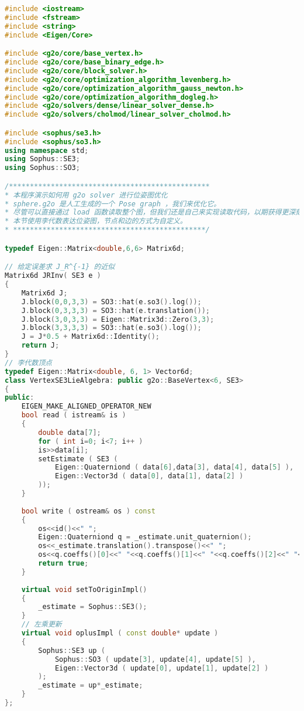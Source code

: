 \clearpage
\begin{lstlisting}[language=c++,caption=slambook/ch11/pose\_graph\_g2o\_lie\_algebra.cpp（片段）]
#include <iostream>
#include <fstream>
#include <string>
#include <Eigen/Core>

#include <g2o/core/base_vertex.h>
#include <g2o/core/base_binary_edge.h>
#include <g2o/core/block_solver.h>
#include <g2o/core/optimization_algorithm_levenberg.h>
#include <g2o/core/optimization_algorithm_gauss_newton.h>
#include <g2o/core/optimization_algorithm_dogleg.h>
#include <g2o/solvers/dense/linear_solver_dense.h>
#include <g2o/solvers/cholmod/linear_solver_cholmod.h>

#include <sophus/se3.h>
#include <sophus/so3.h>
using namespace std;
using Sophus::SE3;
using Sophus::SO3;

/************************************************
* 本程序演示如何用 g2o solver 进行位姿图优化
* sphere.g2o 是人工生成的一个 Pose graph ，我们来优化它。
* 尽管可以直接通过 load 函数读取整个图，但我们还是自己来实现读取代码，以期获得更深刻的理解。
* 本节使用李代数表达位姿图，节点和边的方式为自定义。
* **********************************************/

typedef Eigen::Matrix<double,6,6> Matrix6d;

// 给定误差求 J_R^{-1} 的近似
Matrix6d JRInv( SE3 e )
{
	Matrix6d J;
	J.block(0,0,3,3) = SO3::hat(e.so3().log());
	J.block(0,3,3,3) = SO3::hat(e.translation());
	J.block(3,0,3,3) = Eigen::Matrix3d::Zero(3,3);
	J.block(3,3,3,3) = SO3::hat(e.so3().log());
	J = J*0.5 + Matrix6d::Identity();
	return J;
}
// 李代数顶点
typedef Eigen::Matrix<double, 6, 1> Vector6d;
class VertexSE3LieAlgebra: public g2o::BaseVertex<6, SE3>
{
public:
	EIGEN_MAKE_ALIGNED_OPERATOR_NEW
	bool read ( istream& is )
	{
		double data[7];
		for ( int i=0; i<7; i++ )
		is>>data[i];
		setEstimate ( SE3 (
			Eigen::Quaterniond ( data[6],data[3], data[4], data[5] ),
			Eigen::Vector3d ( data[0], data[1], data[2] )
		));
	}
	
	bool write ( ostream& os ) const
	{
		os<<id()<<" ";
		Eigen::Quaterniond q = _estimate.unit_quaternion();
		os<<_estimate.translation().transpose()<<" ";
		os<<q.coeffs()[0]<<" "<<q.coeffs()[1]<<" "<<q.coeffs()[2]<<" "<<q.coeffs()[3]<<endl;
		return true;
	}
	
	virtual void setToOriginImpl()
	{
		_estimate = Sophus::SE3();
	}
	// 左乘更新
	virtual void oplusImpl ( const double* update )
	{
		Sophus::SE3 up (
			Sophus::SO3 ( update[3], update[4], update[5] ),
			Eigen::Vector3d ( update[0], update[1], update[2] )
		);
		_estimate = up*_estimate;
	}
};


\end{lstlisting}
